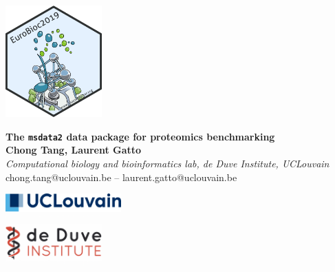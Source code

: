 \documentclass{article}
\title{}
\author{}
\date{}
\begin{document}


\begin{center}
  \colorbox{lgray}{
    \begin{minipage}{3cm}
      \includegraphics[width=10em]{pix/sticker2019.png}
    \end{minipage}

  \begin{minipage}{.74\textwidth}
    \begin{center}
      \huge \textbf{The \texttt{msdata2} data package for proteomics benchmarking} \\
      \vspace{0.4cm}
      \Large \textbf{Chong Tang, Laurent Gatto} \\
      \Large \textit{Computational biology and bioinformatics lab, de Duve Institute, UCLouvain } \\
      \vspace{0.4cm}
      \normalsize chong.tang@uclouvain.be -- laurent.gatto@uclouvain.be \\
    \end{center}
  \end{minipage}
  \begin{minipage}{5cm}
    \includegraphics[width=12em]{pix/ucllogo.png} \\
    \includegraphics[width=10em]{pix/Institut_de_Duve.png}
  \end{minipage}
}
\end{center}


\end{document}
